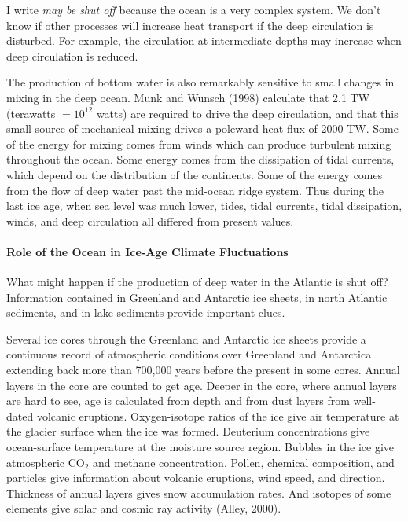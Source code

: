 I write \textit{may be shut off} because the ocean is a very complex
system. We don't know if other processes will increase heat
transport if the deep circulation is
disturbed. For example, the circulation at intermediate depths may
increase when deep circulation is reduced.

The production of bottom water is also remarkably sensitive to small
changes in mixing in the deep ocean. Munk
and Wunsch (1998) calculate that 2.1 TW (terawatts $= 10^{12}$ watts)
are required to drive the deep circulation, and that this small source
of mechanical mixing drives a
poleward heat flux of 2000 TW. Some of the
energy for mixing comes from winds which can
produce turbulent mixing throughout the
ocean. Some energy comes from the dissipation of tidal
currents, which depend on the distribution of the
continents. Some of the energy comes from the flow of deep water past
the mid-ocean ridge system. Thus during the last ice age, when sea
level was much lower, tides, tidal currents, tidal dissipation, winds,
and deep circulation all differed from present values.

\paragraph{Role of the Ocean in Ice-Age Climate Fluctuations}
What might happen if the production of deep water in
the Atlantic is shut off? Information contained in Greenland and
Antarctic ice sheets, in north Atlantic sediments, and in lake
sediments provide important clues.

Several ice cores through the Greenland and Antarctic ice sheets
provide a continuous record of atmospheric
conditions over
Greenland and Antarctica extending back more than 700,000 years before
the present in some cores. Annual layers in the core are counted to
get age. Deeper in the core, where annual layers are hard to see, age
is calculated from depth and from dust layers from well-dated volcanic
eruptions. Oxygen-isotope ratios of the ice give air temperature at
the glacier surface when the ice was formed. Deuterium concentrations
give ocean-surface temperature at the moisture source region. Bubbles
in the ice give atmospheric CO$_2$ and methane concentration. Pollen,
chemical composition, and particles give information about volcanic
eruptions, wind speed, and direction. Thickness of annual layers gives
snow accumulation rates. And isotopes of some elements give solar and
cosmic ray activity (Alley, 2000).

